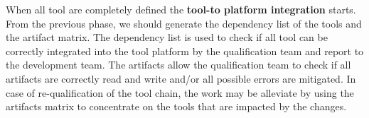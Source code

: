 When all tool are completely defined the {\bf tool-to platform
  integration} starts. From the previous phase, we should generate the
dependency list of the tools and the artifact matrix.  The dependency
list is used to check if all tool can be correctly integrated into the
tool platform by the qualification team and report to the development
team.  The artifacts allow the qualification team to check if all
artifacts are correctly read and write and/or all possible errors are
mitigated.  In case of re-qualification of the tool chain, the work
may be alleviate by using  the artifacts matrix
to concentrate on the tools that are impacted by the changes.






